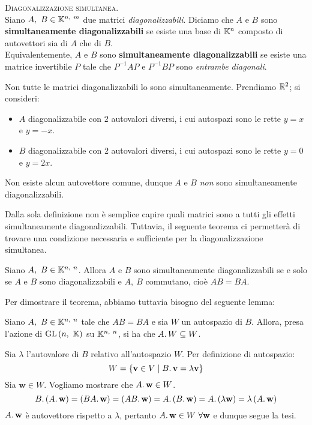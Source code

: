 \begin{define}\textsc{Diagonalizzazione simultanea}.\\
	Siano $A,\ B\in\mathbb{K}^{n,\ m}$ due matrici \textit{diagonalizzabili}. Diciamo che $A$ e $B$ sono \textbf{simultaneamente diagonalizzabili} se esiste una base di $\mathbb{K}^n$ composto di autovettori sia di $A$ che di $B$.\\
	Equivalentemente, $A$ e $B$ sono \textbf{simultaneamente diagonalizzabili} se esiste una matrice invertibile $P$ tale che $P^{-1}AP$ e $P^{-1}BP$ sono \textit{entrambe diagonali}.
\end{define}
\begin{example}
	Non tutte le matrici diagonalizzabili lo sono simultaneamente. Prendiamo $\mathbb{R}^2$; si consideri:
	\begin{itemize}
		\item $A$ diagonalizzabile con $2$ autovalori diversi, i cui autospazi sono le rette $y=x$ e $y=-x$.
		\item $B$ diagonalizzabile con $2$ autovalori diversi, i cui autospazi sono le rette $y=0$ e $y=2x$.
	\end{itemize}
Non esiste alcun autovettore comune, dunque $A$ e $B$ \textit{non} sono simultaneamente diagonalizzabili.
\end{example}
Dalla sola definizione non è semplice capire quali matrici sono a tutti gli effetti simultaneamente diagonalizzabili. Tuttavia, il seguente teorema ci permetterà di trovare una condizione necessaria e sufficiente per la diagonalizzazione simultanea.
\begin{theorema}\label{teoremasimdiag}
	Siano $A,\ B\in\mathbb{K}^{n,\ n}$. Allora $A$ e $B$ sono simultaneamente diagonalizzabili se e solo se $A$ e $ B$ sono diagonalizzabili e $A,\ B$ commutano, cioè $AB=BA$.
\end{theorema}
Per dimostrare il teorema, abbiamo tuttavia bisogno del seguente lemma:
\begin{lemming}
	Siano $A,\ B\in\mathbb{K}^{n,\ n}$ tale che $AB=BA$ e sia $W$ un autospazio di $B$. Allora, presa l'azione di $\gl\left(n,\ \kamp\right)$ su $\kamp^{n,\ n}$, si ha che $A\ldotp W\subseteq W$.
\end{lemming}
\begin{demonstration}
	Sia $\lambda$ l'autovalore di $B$ relativo all'autospazio $W$. Per definizione di autospazio:
	\begin{equation*}
		W=\left\{\mathbf{v}\in V\mid B\ldotp \mathbf{v}=\lambda \mathbf{v}\right\}
	\end{equation*}
Sia $\mathbf{w}\in W$. Vogliamo mostrare che $A\ldotp \mathbf{w}\in W$.
\begin{equation*}
	B\ldotp\left(A\ldotp\mathbf{w}\right)=\left(BA\ldotp\mathbf{w}\right)=\left(AB\ldotp\mathbf{w}\right)=A\ldotp\left(B\ldotp\mathbf{w}\right)=A\ldotp\left(\lambda\mathbf{w}\right)=\lambda\left(A\ldotp\mathbf{w}\right)
\end{equation*}
$A\ldotp \mathbf{w}$ è autovettore rispetto a $\lambda$, pertanto $A\ldotp \mathbf{w}\in W\ \forall \mathbf{w}$ e dunque segue la tesi.
\end{demonstration}
